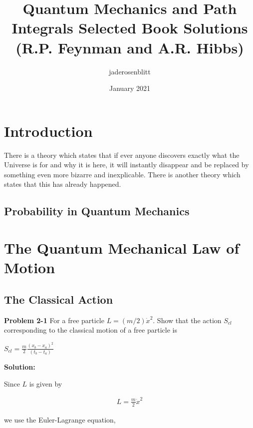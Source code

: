 \documentclass{article}
\title{Quantum Mechanics and Path Integrals Selected Book Solutions (R.P. Feynman and A.R. Hibbs) }
\author{jaderosenblitt }
\date{January 2021}
\begin{document}
\maketitle

\section{Introduction}
There is a theory which states that if ever anyone discovers exactly what the Universe is for and why it is here, it will instantly disappear and be replaced by something even more bizarre and inexplicable.
There is another theory which states that this has already happened.

\subsection{Probability in Quantum Mechanics}

%


\section{The Quantum Mechanical Law of Motion}

\subsection{The Classical Action}

\textbf{Problem 2-1}
For a free particle $L = (m/2)\dot{x}^2$. Show that the action $S_{cl}$ corresponding to the classical motion of a free particle is 

$S_{cl} = \frac{m}{2}\frac{(x_{b} - x_{a})^2}{(t_{b} - t_{a})}$



\textbf{Solution:} 

Since $L$ is given by 

\begin{align*}
         L = \frac{m}{2}\dot{x}^2
\end{align*}

we use the Euler-Lagrange equation, 
\end{document}
